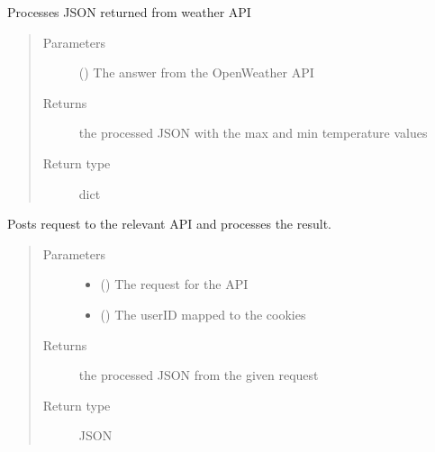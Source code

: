 \documentclass[letterpaper,10pt,english]{sphinxmanual}
\begin{document}
\begin{fulllineitems}
\label{\detokenize{DialogFlow_Bridge_API:DialogFlow_Bridge_API.getWeatherInfo}}
\pysigstartsignatures
{}
\pysigstopsignatures
\sphinxAtStartPar
Processes JSON returned from weather API
\begin{quote}\begin{description}
\item[{Parameters}] \leavevmode
\sphinxAtStartPar
{} () \textendash{} The answer from the OpenWeather API

\item[{Returns}] \leavevmode
\sphinxAtStartPar
the processed JSON with the max and min temperature values

\item[{Return type}] \leavevmode
\sphinxAtStartPar
dict

\end{description}\end{quote}

\end{fulllineitems}


\begin{fulllineitems}
\label{\detokenize{DialogFlow_Bridge_API:DialogFlow_Bridge_API.processRequest}}
\pysigstartsignatures
{}
\pysigstopsignatures
\sphinxAtStartPar
Posts request to the relevant API and processes the result.
\begin{quote}\begin{description}
\item[{Parameters}] \leavevmode\begin{itemize}
\item {} 
\sphinxAtStartPar
{} () \textendash{} The request for the API

\item {} 
\sphinxAtStartPar
{} () \textendash{} The userID mapped to the cookies

\end{itemize}

\item[{Returns}] \leavevmode
\sphinxAtStartPar
the processed JSON from the given request

\item[{Return type}] \leavevmode
\sphinxAtStartPar
JSON

\end{description}\end{quote}

\end{fulllineitems}
\end{document}
